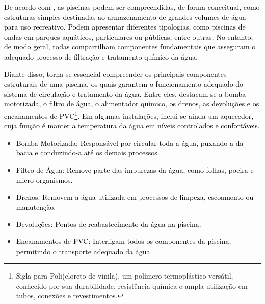         \textcolor{black}{De acordo com \cite{refComponents}, as piscinas podem ser compreendidas, de forma conceitual, como estruturas simples destinadas ao armazenamento de grandes volumes de água para uso recreativo. Podem apresentar diferentes tipologias, como piscinas de ondas em parques aquáticos, particulares ou públicas, entre outras. No entanto, de modo geral, todas compartilham componentes fundamentais que asseguram o adequado processo de filtração e tratamento químico da água.}

        \textcolor{black}{Diante disso, torna-se essencial compreender os principais componentes estruturais de uma piscina, os quais garantem o funcionamento adequado do sistema de circulação e tratamento da água. Entre eles, destacam-se a bomba motorizada, o filtro de água, o alimentador químico, os drenos, as devoluções e os encanamentos de PVC\footnote{Sigla para Poli(cloreto de vinila), um polímero termoplástico versátil, conhecido por sua durabilidade, resistência química e ampla utilização em tubos, conexões e revestimentos.}. Em algumas instalações, inclui-se ainda um aquecedor, cuja função é manter a temperatura da água em níveis controlados e confortáveis.}

        \begin{itemize}
        
            \item \textcolor{black}{Bomba Motorizada:}
                \textcolor{black}{Responsável por circular toda a água, puxando-a da bacia e conduzindo-a até os demais processos.}

            \item \textcolor{black}{Filtro de Água:}
                \textcolor{black}{Remove parte das impurezas da água, como folhas, poeira e micro-organismos.}


            \item \textcolor{black}{Drenos:}
                \textcolor{black}{Removem a água utilizada em processos de limpeza, escoamento ou manutenção.}

            \item \textcolor{black}{Devoluções:}
                \textcolor{black}{Pontos de reabastecimento da água na piscina.}

            \item \textcolor{black}{Encanamentos de PVC:}
                \textcolor{black}{Interligam todos os componentes da piscina, permitindo o transporte adequado da água.}
                
        \end{itemize}

